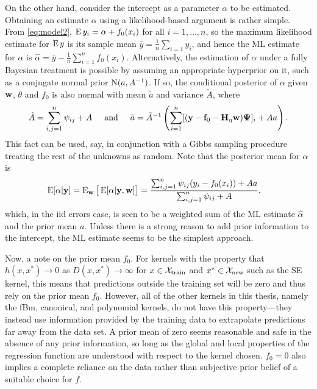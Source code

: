 On the other hand, consider the intercept as a parameter $\alpha$ to be estimated.
Obtaining an estimate $\alpha$ using a likelihood-based argument is rather simple.
From \eqref{eq:model2}, $\operatorname{E} y_i = \alpha + f_0(x_i)$ for all $i=1,\dots,n$, so the maximum likelihood estimate for $\operatorname{E} y$ is its sample mean $\bar y = \frac{1}{n}\sum_{i=1} y_i$, and hence the ML estimate for $\alpha$ is $\hat\alpha = \bar y - \frac{1}{n} \sum_{i=1}^n f_0(x_i)$.
Alternatively, the estimation of $\alpha$ under a fully Bayesian treatment is possible by assuming an appropriate hyperprior on it, such as a conjugate normal prior $\operatorname{N}(a,A^{-1})$.
If so, the conditional posterior of $\alpha$ given ${\mathbf w}$, $\theta$ and $f_0$ is also normal with mean $\tilde a$ and variance $\tilde A$, where
\[
  \tilde A = \sum_{i,j=1}^n \psi_{ij} + A
  \hspace{0.5cm}\text{and}\hspace{0.5cm}
  \tilde a = \tilde A^{-1}\left( \sum_{i=1}^n [({\mathbf y}-{\mathbf f}_0-{\mathbf H}_\eta {\mathbf w}){\bm\Psi}]_i + Aa \right).
\]
This fact can be used, say, in conjunction with a Gibbs sampling procedure treating the rest of the unknowns as random.
Note that the posterior mean for $\alpha$ is
\begin{align*}
  \operatorname{E} [\alpha|{\mathbf y}] 
  &= \operatorname{E}_{\mathbf w}\big[ \operatorname{E} [\alpha|{\mathbf y},{\mathbf w}] \big] 
  = \frac{\sum_{i,j=1}^n \psi_{ij}(y_i-f_0(x_i)) + Aa}{\sum_{i,j=1}^n \psi_{ij} + A},
\end{align*}
which, in the iid errors case, is seen to be a weighted sum of the ML estimate $\hat\alpha$ and the prior mean $a$.
Unless there is a strong reason to add prior information to the intercept, the ML estimate seems to be the simplest approach.

Now, a note on the prior mean $f_0$.
For kernels with the property that $h(x,x^*) \to 0$ as $D(x,x^*) \to \infty$ for $x \in {\mathcal X}_{\text{train}}$ and $x^* \in {\mathcal X}_\text{new}$ such as the SE kernel, this means that predictions outside the training set will be zero and thus rely on the prior mean $f_0$.
However, all of the other kernels in this thesis, namely the fBm, canonical, and polynomial kernels, do not have this property---they instead use information provided by the training data to extrapolate predictions far away from the data set.
A prior mean of zero seems reasonable and safe in the absence of any prior information, so long as the global and local properties of the regression function are understood with respect to the kernel chosen.
$f_0=0$ also implies a complete reliance on the data rather than subjective prior belief of a suitable choice for $f$.

